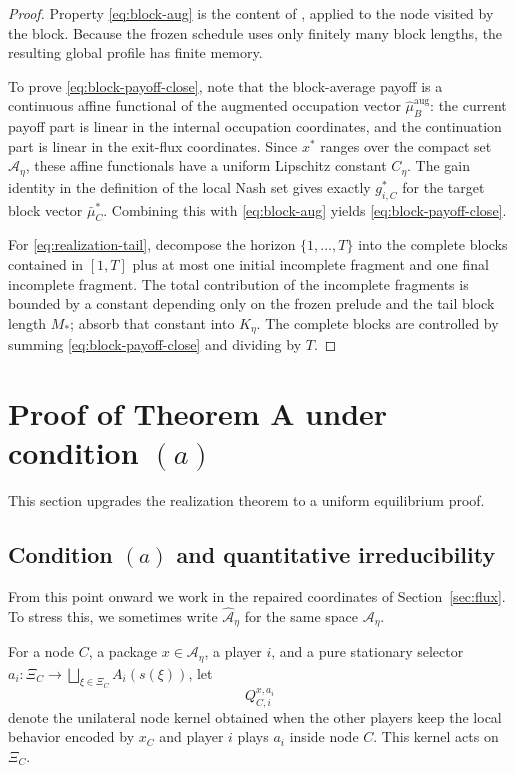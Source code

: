 \documentclass[12pt]{article}
\theoremstyle{definition}
\newcommand{\1}{\mathbf{1}}
\newcommand{\cA}{\mathcal{A}}
\begin{document}
\begin{proof}
Property \eqref{eq:block-aug} is the content of , applied to
the node visited by the block.  Because the frozen schedule uses only finitely many block
lengths, the resulting global profile has finite memory.

To prove \eqref{eq:block-payoff-close}, note that the block-average payoff is a continuous
affine functional of the augmented occupation vector \(\widehat\mu_B^{\mathrm{aug}}\): the
current payoff part is linear in the internal occupation coordinates, and the continuation
part is linear in the exit-flux coordinates.  Since \(x^*\) ranges over the compact set
\(\cA_\eta\), these affine functionals have a uniform Lipschitz constant \(C_\eta\).  The
gain identity in the definition of the local Nash set gives exactly \(g_{i,C}^*\) for the
target block vector \(\bar\mu_C^*\).  Combining this with \eqref{eq:block-aug} yields
\eqref{eq:block-payoff-close}.

For \eqref{eq:realization-tail}, decompose the horizon \(\{1,\dots,T\}\) into the complete
blocks contained in \([1,T]\) plus at most one initial incomplete fragment and one final
incomplete fragment.  The total contribution of the incomplete fragments is bounded by a
constant depending only on the frozen prelude and the tail block length \(M_*\); absorb
that constant into \(K_\eta\).  The complete blocks are controlled by summing
\eqref{eq:block-payoff-close} and dividing by \(T\).
\end{proof}

\section{Proof of Theorem A under condition \texorpdfstring{$(a)$}{(a)}}
\label{sec:proofA}

This section upgrades the realization theorem to a uniform equilibrium proof.

\subsection{Condition \texorpdfstring{$(a)$}{(a)} and quantitative irreducibility}

From this point onward we work in the repaired coordinates of Section~\ref{sec:flux}.  To
stress this, we sometimes write \(\widehat{\cA}_\eta\) for the same space \(\cA_\eta\).

For a node \(C\), a package \(x\in \cA_\eta\), a player \(i\), and a pure stationary
selector \(a_i:\Xi_C\to \bigsqcup_{\xi\in \Xi_C}A_i(s(\xi))\), let
\[
Q_{C,i}^{x,a_i}
\]
denote the unilateral node kernel obtained when the other players keep the local behavior
encoded by \(x_C\) and player \(i\) plays \(a_i\) inside node \(C\).  This kernel acts on
\(\Xi_C\).
\end{document}
